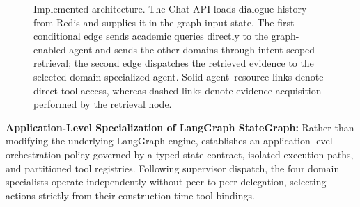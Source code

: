 \begin{figure}[h!]
\begin{tikzpicture}
\end{tikzpicture}
\caption{Implemented \system{} architecture. The Chat API loads dialogue history from Redis and supplies it in the graph input state. The first conditional edge sends academic queries directly to the graph-enabled agent and sends the other domains through intent-scoped retrieval; the second edge dispatches the retrieved evidence to the selected domain-specialized agent. Solid agent--resource links denote direct tool access, whereas dashed links denote evidence acquisition performed by the retrieval node.}
\label{fig:architecture}
\end{figure}

\textbf{Application-Level Specialization of LangGraph StateGraph:}
Rather than modifying the underlying LangGraph engine, \system{} establishes an application-level orchestration policy governed by a typed state contract, isolated execution paths, and partitioned tool registries. Following supervisor dispatch, the four domain specialists operate independently without peer-to-peer delegation, selecting actions strictly from their construction-time tool bindings.
